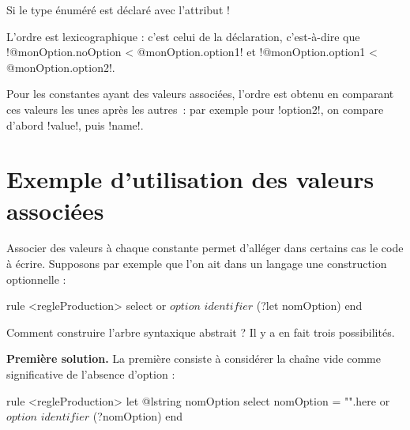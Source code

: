 Si le type énuméré est déclaré avec l'attribut \ggsq!%



L'ordre est lexicographique : c'est celui de la déclaration, c'est-à-dire que \ggsq!@monOption.noOption < @monOption.option1! et \ggsq!@monOption.option1 < @monOption.option2!.

Pour les constantes ayant des valeurs associées, l'ordre est obtenu en comparant ces valeurs les unes après les autres~: par exemple pour \ggsq!option2!, on compare d'abord \ggsq!value!, puis \ggsq!name!. 









\section{Exemple d'utilisation des valeurs associées}

Associer des valeurs à chaque constante permet d'alléger dans certains cas le code à écrire. Supposons par exemple que l'on ait dans un langage une construction optionnelle :

\begin{galgas34}
rule <regleProduction> {
  select
  or
    $option$
    $identifier$ (?let nomOption)
  end
}
\end{galgas34}

Comment construire l'arbre syntaxique abstrait ? Il y a en fait trois possibilités.

\textbf{Première solution.} La première consiste à considérer la chaîne vide comme significative de l'absence d'option :
\begin{galgas34}
rule <regleProduction> {
  let @lstring nomOption
  select
    nomOption = "".here
  or
    $option$
    $identifier$ (?nomOption)
  end
}
\end{galgas34}

